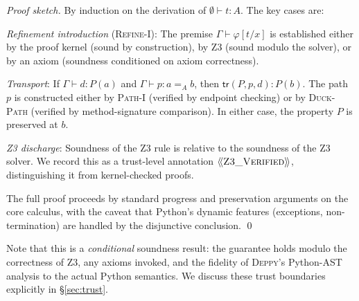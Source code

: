 \documentclass[acmsmall,nonacm,screen]{acmart}
\newcommand{\deppy}{\textsc{Deppy}}
\newcommand{\syntype}[1]{\ensuremath{\mathsf{#1}}}
\newcommand{\pathtype}[3]{#2 =_{#1} #3}
\newcommand{\ctx}{\Gamma}
\newcommand{\jdg}[3]{#1 \vdash #2 : #3}
\newcommand{\proves}{\vdash}
\newcommand{\transport}[3]{\syntype{tr}(#1, #2, #3)}
\newcommand{\trustlevel}[1]{\ensuremath{\langle\!\langle \text{#1} \rangle\!\rangle}}
\begin{document}
\begin{proof}[Proof sketch]
By induction on the derivation of $\jdg{\emptyset}{t}{A}$.  The key
cases are:

\emph{Refinement introduction} (\textsc{Refine-I}): The premise
$\ctx \proves \varphi[t/x]$ is established either by the proof kernel
(sound by construction), by Z3 (sound modulo the solver), or by an
axiom (soundness conditioned on axiom correctness).

\emph{Transport}: If $\jdg{\ctx}{d}{P(a)}$ and
$\jdg{\ctx}{p}{\pathtype{A}{a}{b}}$, then
$\transport{P}{p}{d} : P(b)$.  The path $p$ is constructed either by
\textsc{Path-I} (verified by endpoint checking) or by
\textsc{Duck-Path} (verified by method-signature comparison).  In
either case, the property $P$ is preserved at $b$.

\emph{Z3 discharge}: Soundness of the Z3 rule is relative to the
soundness of the Z3 solver.  We record this as a trust-level
annotation $\trustlevel{\textsc{Z3\_Verified}}$, distinguishing it
from kernel-checked proofs.

The full proof proceeds by standard progress and preservation arguments
on the core calculus, with the caveat that Python's dynamic features
(exceptions, non-termination) are handled by the disjunctive conclusion.
\qed
\end{proof}

Note that this is a \emph{conditional} soundness result: the
guarantee holds modulo the correctness of Z3, any axioms invoked, and
the fidelity of \deppy{}'s Python-AST analysis to the actual Python
semantics.  We discuss these trust boundaries explicitly in
\S\ref{sec:trust}.
\end{document}
